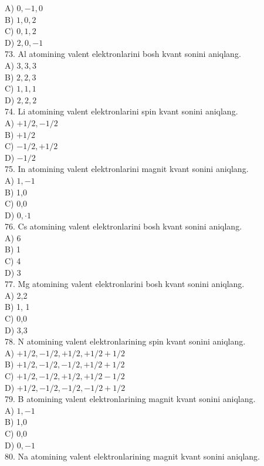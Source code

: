 A) $0,-1,0$\\
B) $1,0,2$\\
C) $0,1,2$\\
D) $2,0,-1$\\
73. Al atomining valent elektronlarini bosh kvant sonini aniqlang.\\
A) $3,3,3$\\
B) $2,2,3$\\
C) $1,1,1$\\
D) $2,2,2$\\
74. Li atomining valent elektronlarini spin kvant sonini aniqlang.\\
A) $+1 / 2,-1 / 2$\\
B) $+1 / 2$\\
C) $-1 / 2,+1 / 2$\\
D) $-1 / 2$\\
75. In atomining valent elektronlarini magnit kvant sonini aniqlang.\\
A) $1,-1$\\
B) 1,0\\
C) 0,0\\
D) $0, \cdot 1$\\
76. Cs atomining valent elektronlarini bosh kvant sonini aniqlang.\\
A) 6\\
B) 1\\
C) 4\\
D) 3\\
77. Mg atomining valent elektronlarini bosh kvant sonini aniqlang.\\
A) 2,2\\
B) 1, 1\\
C) 0,0\\
D) 3,3\\
78. N atomining valent elektronlarining spin kvant sonini aniqlang.\\
A) $+1 / 2,-1 / 2,+1 / 2,+1 / 2+1 / 2$\\
B) $+1 / 2,-1 / 2,-1 / 2,+1 / 2+1 / 2$\\
C) $+1 / 2,-1 / 2,+1 / 2,+1 / 2-1 / 2$\\
D) $+1 / 2,-1 / 2,-1 / 2,-1 / 2+1 / 2$\\
79. B atomining valent elektronlarining magnit kvant sonini aniqlang.\\
A) $1,-1$\\
B) 1,0\\
C) 0,0\\
D) $0,-1$\\
80. Na atomining valent elektronlarining magnit kvant sonini aniqlang.\\
